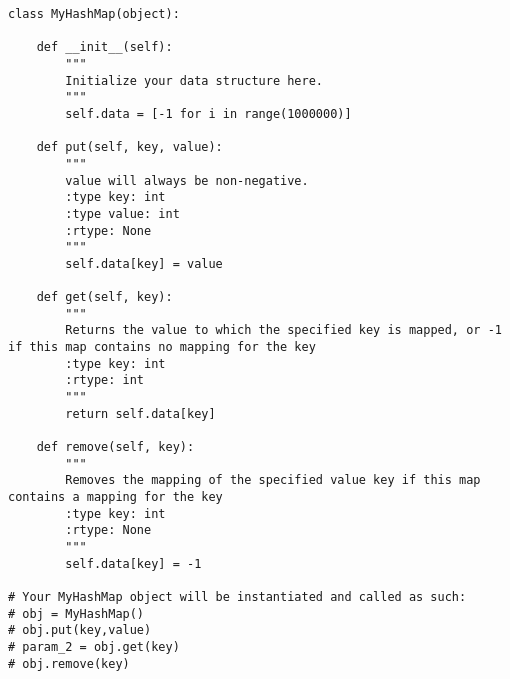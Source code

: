 \begin{lstlisting}
class MyHashMap(object):

    def __init__(self):
        """
        Initialize your data structure here.
        """
        self.data = [-1 for i in range(1000000)]
        
    def put(self, key, value):
        """
        value will always be non-negative.
        :type key: int
        :type value: int
        :rtype: None
        """
        self.data[key] = value
        
    def get(self, key):
        """
        Returns the value to which the specified key is mapped, or -1 if this map contains no mapping for the key
        :type key: int
        :rtype: int
        """
        return self.data[key]
        
    def remove(self, key):
        """
        Removes the mapping of the specified value key if this map contains a mapping for the key
        :type key: int
        :rtype: None
        """
        self.data[key] = -1

# Your MyHashMap object will be instantiated and called as such:
# obj = MyHashMap()
# obj.put(key,value)
# param_2 = obj.get(key)
# obj.remove(key)
\end{lstlisting}

